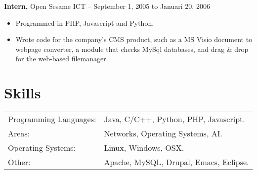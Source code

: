 \documentclass{res}
\begin{document}
\begin{resume}
{\bf Intern,} Open Sesame ICT -- September 1, 2005 to Januari 20, 2006
\begin{itemize} \itemsep -2pt
\item Programmed in PHP, Javascript and Python.
\item Wrote code for the company's CMS product, such as a MS Visio
  document to webpage converter, a module that checks MySql databases,
  and drag \& drop for the web-based filemanager.
\end{itemize}

\section{Skills}
\label{sec:skills}

\begin{tabular}{l l}
Programming Languages: & Java, C/C++, Python, PHP, Javascript.\\
Areas: & Networks, Operating Systems, AI.\\
Operating Systems: & Linux, Windows, OSX.\\
Other: & Apache, MySQL, Drupal, Emacs, Eclipse.\\
\end{tabular}

\end{resume}
\end{document}
